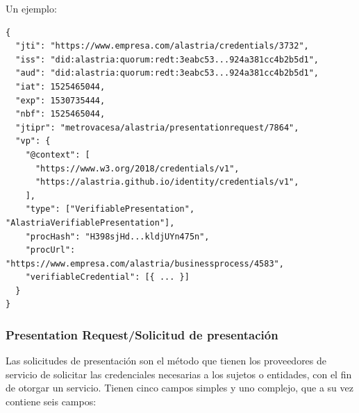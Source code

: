 Un ejemplo:
\begin{verbatim}
{
  "jti": "https://www.empresa.com/alastria/credentials/3732",
  "iss": "did:alastria:quorum:redt:3eabc53...924a381cc4b2b5d1",
  "aud": "did:alastria:quorum:redt:3eabc53...924a381cc4b2b5d1",
  "iat": 1525465044,
  "exp": 1530735444,
  "nbf": 1525465044,
  "jtipr": "metrovacesa/alastria/presentationrequest/7864",
  "vp": {
    "@context": [
      "https://www.w3.org/2018/credentials/v1",
      "https://alastria.github.io/identity/credentials/v1",
    ],
    "type": ["VerifiablePresentation", "AlastriaVerifiablePresentation"],
    "procHash": "H398sjHd...kldjUYn475n",
    "procUrl": "https://www.empresa.com/alastria/businessprocess/4583",
    "verifiableCredential": [{ ... }]
  }
}
\end{verbatim}
\subsubsection*{Presentation Request/Solicitud de presentación}
Las solicitudes de presentación son el método que tienen los proveedores de servicio de solicitar las credenciales necesarias a los sujetos o entidades, con el fin de otorgar un servicio.
Tienen cinco campos simples y uno complejo, que a su vez contiene seis campos:
